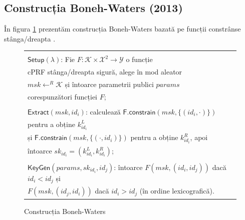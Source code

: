 \documentclass[oneside, 12pt]{book}
\begin{document}
\subsection{Construcția Boneh-Waters (2013)}
\label{subsec:boneh-waters}
În figura \ref{fig:bw-nike} prezentăm construcția Boneh-Waters bazată pe funcții constrânse stânga/dreapta \cite{boneh:2013constrained}.

\begin{figure}[h!]

\begin{tabular}{|p{\textwidth}|}
\hline

\\
\hspace{.1in}
$\mathsf{Setup}(\lambda)$: Fie $F : \mathcal{K} \times \mathcal{X}^2 \rightarrow \mathcal{Y}$ o funcție \\
	\hspace{.3in} cPRF stânga/dreapta sigură, alege în mod aleator \\
	\hspace{.3in} $msk \leftarrow^R \mathcal{K}$ și întoarce parametrii publici $params$ \\ 
	\hspace{.3in} corespunzători funcției $F$; \\

\\
\hspace{.1in}
$\mathsf{Extract}(msk, id_i)$: calculează $\mathsf{F.constrain}(msk, \{(id_i, \cdot)\})$ \\
	\hspace{.3in} pentru a obține $k^{L}_{id_i}$ \\
	\hspace{.3in} și $\mathsf{F.constrain}(msk, \{(\cdot, id_i)\})$ pentru a obține $k^{R}_{id_i}$, apoi \\ 
	\hspace{.3in} întoarce $sk_{id_i} = (k^{L}_{id_i},k^{R}_{id_i})$; \\

\\
\hspace{.1in}
$\mathsf{KeyGen}(params, sk_{id_i},id_j)$: întoarce $F(msk, (id_i, id_j))$ dacă $id_i < id_j$ și \\
	\hspace{.3in} $F(msk, (id_j, id_i))$ dacă $ id_i > id_j$ (în ordine lexicografică).

\\
\hline
\end{tabular}
\caption{Construcția Boneh-Waters \cite{boneh:2013constrained}}
\label{fig:bw-nike}
\end{figure}
\end{document}
